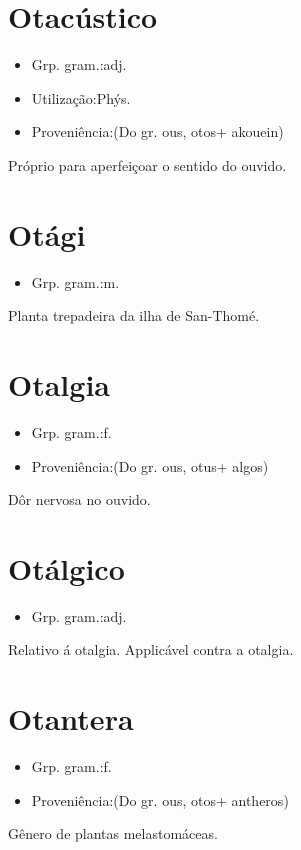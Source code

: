 \section{Otacústico}
\begin{itemize}
\item {Grp. gram.:adj.}
\end{itemize}
\begin{itemize}
\item {Utilização:Phýs.}
\end{itemize}
\begin{itemize}
\item {Proveniência:(Do gr. \textunderscore ous\textunderscore , \textunderscore otos\textunderscore  + \textunderscore akouein\textunderscore )}
\end{itemize}
Próprio para aperfeiçoar o sentido do ouvido.
\section{Otági}
\begin{itemize}
\item {Grp. gram.:m.}
\end{itemize}
Planta trepadeira da ilha de San-Thomé.
\section{Otalgia}
\begin{itemize}
\item {Grp. gram.:f.}
\end{itemize}
\begin{itemize}
\item {Proveniência:(Do gr. \textunderscore ous\textunderscore , \textunderscore otus\textunderscore  + \textunderscore algos\textunderscore )}
\end{itemize}
Dôr nervosa no ouvido.
\section{Otálgico}
\begin{itemize}
\item {Grp. gram.:adj.}
\end{itemize}
Relativo á otalgia.
Applicável contra a otalgia.
\section{Otantera}
\begin{itemize}
\item {Grp. gram.:f.}
\end{itemize}
\begin{itemize}
\item {Proveniência:(Do gr. \textunderscore ous\textunderscore , \textunderscore otos\textunderscore  + \textunderscore antheros\textunderscore )}
\end{itemize}
Gênero de plantas melastomáceas.
